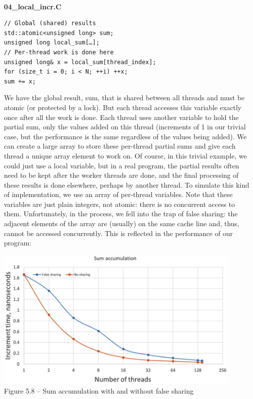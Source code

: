 \hspace*{\fill} \\ %
\noindent
\textbf{04\_local\_incr.C}
\begin{lstlisting}[style=styleCXX]
// Global (shared) results
std::atomic<unsigned long> sum;
unsigned long local_sum[…];
// Per-thread work is done here
unsigned long& x = local_sum[thread_index];
for (size_t i = 0; i < N; ++i) ++x;
sum += x;
\end{lstlisting}

We have the global result, sum, that is shared between all threads and must be atomic (or protected by a lock). But each thread accesses this variable exactly once after all the work is done. Each thread uses another variable to hold the partial sum, only the values added on this thread (increments of 1 in our trivial case, but the performance is the same regardless of the values being added). We can create a large array to store these per-thread partial sums and give each thread a unique array element to work on. Of course, in this trivial example, we could just use a local variable, but in a real program, the partial results often need to be kept after the worker threads are done, and the final processing of these results is done elsewhere, perhaps by another thread. To simulate this kind of implementation, we use an array of per-thread variables. Note that these variables are just plain integers, not atomic: there is no concurrent access to them. Unfortunately, in the process, we fell into the trap of false sharing: the adjacent elements of the array are (usually) on the same cache line and, thus, cannot be accessed concurrently. This is reflected in the performance of our program:

\begin{center}
\includegraphics[width=0.9\textwidth]{content/1/chapter5/images/8.jpg}\\
Figure 5.8 – Sum accumulation with and without false sharing
\end{center}

